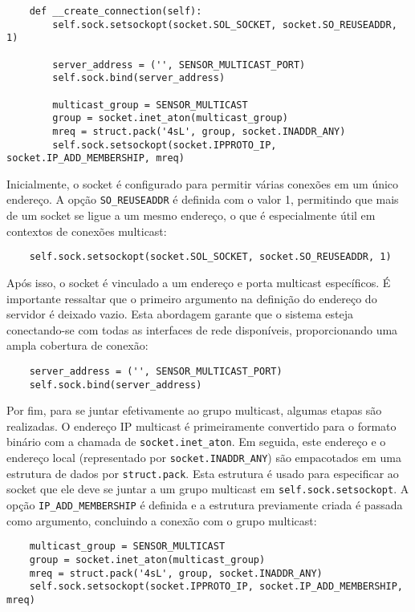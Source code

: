 \begin{verbatim}
    def __create_connection(self):
        self.sock.setsockopt(socket.SOL_SOCKET, socket.SO_REUSEADDR, 1)

        server_address = ('', SENSOR_MULTICAST_PORT)
        self.sock.bind(server_address)

        multicast_group = SENSOR_MULTICAST
        group = socket.inet_aton(multicast_group)
        mreq = struct.pack('4sL', group, socket.INADDR_ANY)
        self.sock.setsockopt(socket.IPPROTO_IP, socket.IP_ADD_MEMBERSHIP, mreq)
\end{verbatim}

Inicialmente, o socket é configurado para permitir várias conexões em um único endereço. A opção \texttt{SO\_REUSEADDR} é definida com o valor 1, permitindo que mais de um socket se ligue a um mesmo endereço, o que é especialmente útil em contextos de conexões multicast:

\begin{verbatim}
    self.sock.setsockopt(socket.SOL_SOCKET, socket.SO_REUSEADDR, 1)
\end{verbatim}

Após isso, o socket é vinculado a um endereço e porta multicast específicos. É importante ressaltar que o primeiro argumento na definição do endereço do servidor é deixado vazio. Esta abordagem garante que o sistema esteja conectando-se com todas as interfaces de rede disponíveis, proporcionando uma ampla cobertura de conexão:

\begin{verbatim}
    server_address = ('', SENSOR_MULTICAST_PORT)
    self.sock.bind(server_address)
\end{verbatim}

Por fim, para se juntar efetivamente ao grupo multicast, algumas etapas são realizadas. O endereço IP multicast é primeiramente convertido para o formato binário com a chamada de \texttt{socket.inet\_aton}. Em seguida, este endereço e o endereço local (representado por \texttt{socket.INADDR\_ANY}) são empacotados em uma estrutura de dados por \texttt{struct.pack}. Esta estrutura é usado para especificar ao socket que ele deve se juntar a um grupo multicast em \texttt{self.sock.setsockopt}. A opção \texttt{IP\_ADD\_MEMBERSHIP} é definida e a estrutura previamente criada é passada como argumento, concluindo a conexão com o grupo multicast:

\begin{verbatim}
    multicast_group = SENSOR_MULTICAST
    group = socket.inet_aton(multicast_group)
    mreq = struct.pack('4sL', group, socket.INADDR_ANY)
    self.sock.setsockopt(socket.IPPROTO_IP, socket.IP_ADD_MEMBERSHIP, mreq)
\end{verbatim}

